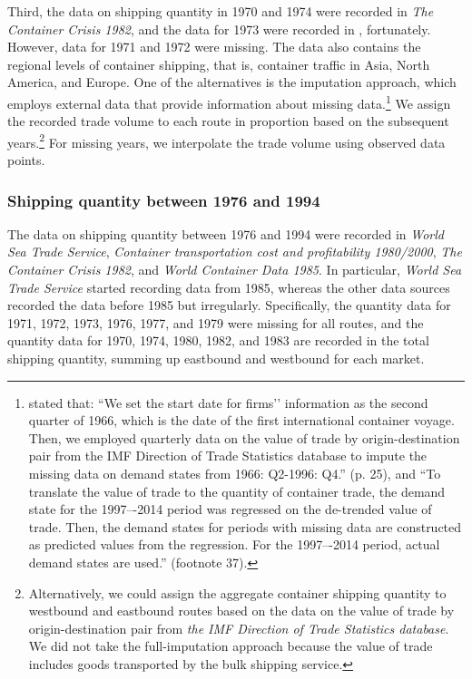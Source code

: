 Third, the data on shipping quantity in 1970 and 1974 were recorded in \textit{The Container Crisis 1982}, and the data for 1973 were recorded in , fortunately. However, data for 1971 and 1972 were missing. The data also contains the regional levels of container shipping, that is, container traffic in Asia, North America, and Europe. One of the alternatives is the imputation approach, which employs external data that provide information about missing data.\footnote{\cite{jeon2022learning} stated that: “We set the start date for firms’’ information as the second quarter of 1966, which is the date of the first international container voyage. Then, we employed quarterly data on the value of trade by origin-destination pair from the IMF Direction of Trade Statistics database to impute the missing data on demand states from 1966: Q2-1996: Q4.” (p. 25), and “To translate the value of trade to the quantity of container trade, the demand state for the 1997–-2014 period was regressed on the de-trended value of trade. Then, the demand states for periods with missing data are constructed as predicted values from the regression. For the 1997–-2014 period, actual demand states are used.” (footnote 37).} We assign the recorded trade volume to each route in proportion based on the subsequent years.\footnote{Alternatively, we could assign the aggregate container shipping quantity to westbound and eastbound routes based on the data on the value of trade by origin-destination pair from \textit{the IMF Direction of Trade Statistics database}. We did not take the full-imputation approach because the value of trade includes goods transported by the bulk shipping service.} For missing years, we interpolate the trade volume using observed data points.



\subsubsection{Shipping quantity between 1976 and 1994}

The data on shipping quantity between 1976 and 1994 were recorded in \textit{World Sea Trade Service}, \textit{Container transportation cost and profitability 1980/2000}, \textit{The Container Crisis 1982}, and \textit{World Container Data 1985}. In particular, \textit{World Sea Trade Service} started recording data from 1985, whereas the other data sources recorded the data before 1985 but irregularly. Specifically, the quantity data for 1971, 1972, 1973, 1976, 1977, and 1979 were missing for all routes, and the quantity data for 1970, 1974, 1980, 1982, and 1983 are recorded in the total shipping quantity, summing up eastbound and westbound for each market.




